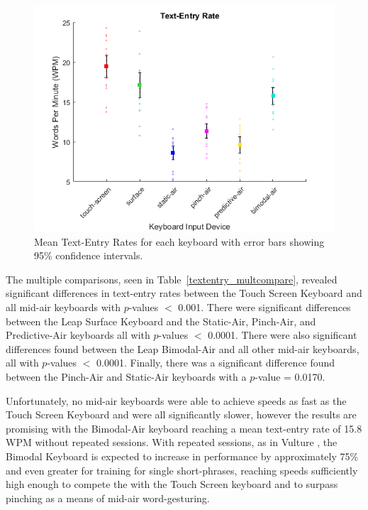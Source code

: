 \begin{figure}[h]
	\centering
	\includegraphics{fig_textentry_mean}
	\caption[Mean Text-Entry Rates]{Mean Text-Entry Rates for each keyboard with error bars showing 95\% confidence intervals.}
	\label{fig_textentry_mean}
\end{figure}

The multiple comparisons, seen in Table~\ref{textentry_multcompare}, revealed significant differences in text-entry rates between the Touch Screen Keyboard and all mid-air keyboards with $p$-values $<$ 0.001. There were significant differences between the Leap Surface Keyboard and the Static-Air, Pinch-Air, and Predictive-Air keyboards all with $p$-values $<$ 0.0001. There were also significant differences found between the Leap Bimodal-Air and all other mid-air keyboards, all with $p$-values $<$ 0.0001. Finally, there was a significant difference found between the Pinch-Air and Static-Air keyboards with a $p$-value = 0.0170.

Unfortunately, no mid-air keyboards were able to achieve speeds as fast as the Touch Screen Keyboard and were all significantly slower, however the results are promising with the Bimodal-Air keyboard reaching a mean text-entry rate of 15.8 WPM without repeated sessions. With repeated sessions, as in Vulture \cite{ref_vulture}, the Bimodal Keyboard is expected to increase in performance by approximately 75\% and even greater for training for single short-phrases, reaching speeds sufficiently high enough to compete the with the Touch Screen keyboard and to surpass pinching as a means of mid-air word-gesturing.


